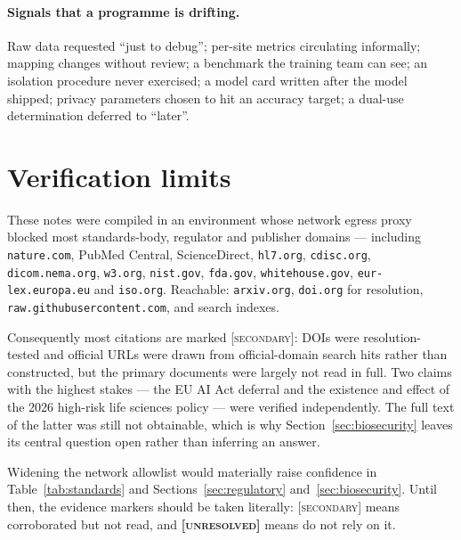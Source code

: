 \documentclass[11pt,a4paper]{article}
\newcommand{\flag}[1]{\textcolor{flagcolor}{\textbf{#1}}}
\newcommand{\secondary}{\textsc{[secondary]}}
\newcommand{\unresolved}{\flag{\textsc{[unresolved]}}}
\begin{document}
\paragraph{Signals that a programme is drifting.} Raw data requested ``just
to debug''; per-site metrics circulating informally; mapping changes without
review; a benchmark the training team can see; an isolation procedure never
exercised; a model card written after the model shipped; privacy parameters
chosen to hit an accuracy target; a dual-use determination deferred to
``later''.

\appendix
\section{Verification limits}

These notes were compiled in an environment whose network egress proxy
blocked most standards-body, regulator and publisher domains --- including
\texttt{nature.com}, PubMed Central, ScienceDirect, \texttt{hl7.org},
\texttt{cdisc.org}, \texttt{dicom.nema.org}, \texttt{w3.org},
\texttt{nist.gov}, \texttt{fda.gov}, \texttt{whitehouse.gov},
\texttt{eur-lex.europa.eu} and \texttt{iso.org}. Reachable:
\texttt{arxiv.org}, \texttt{doi.org} for resolution,
\texttt{raw.githubusercontent.com}, and search indexes.

Consequently most citations are marked \secondary: DOIs were resolution-
tested and official URLs were drawn from official-domain search hits rather
than constructed, but the primary documents were largely not read in full.
Two claims with the highest stakes --- the EU AI Act deferral
\citep{euomnibus2026} and the existence and effect of the 2026 high-risk
life sciences policy \citep{usgstopping2026} --- were verified
independently. The full text of the latter was still not obtainable, which
is why Section~\ref{sec:biosecurity} leaves its central question open rather
than inferring an answer.

Widening the network allowlist would materially raise confidence in
Table~\ref{tab:standards} and Sections~\ref{sec:regulatory}
and~\ref{sec:biosecurity}. Until then, the evidence markers should be taken
literally: \secondary{} means corroborated but not read, and \unresolved{}
means do not rely on it.



\end{document}
